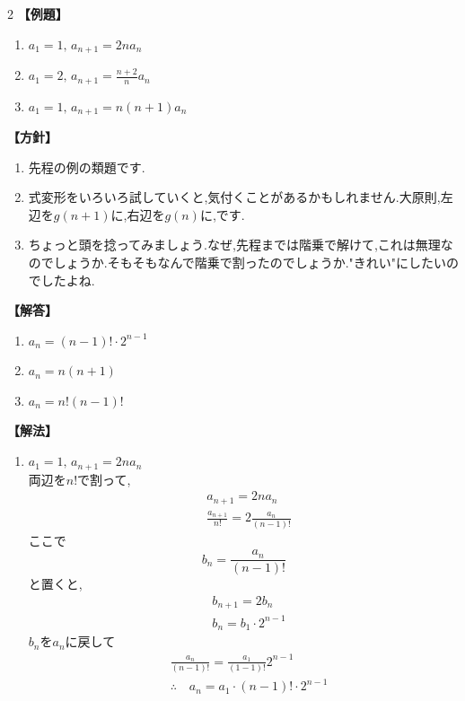 \documentclass[dvipdfmx,a4paper,11pt,fleqn,openany]{jsbook}
\begin{document}
\begin{multicols*}{2}
      \noindent \textbf{【例題】}
      \begin{enumerate}[label=(\arabic*),parsep=3pt]
        \item $\displaystyle a_1=1,\, a_{n+1}=2na_n$
        \item $\displaystyle a_1=2,\, a_{n+1}=\frac{n+2}{n}a_n$
        \item $\displaystyle a_1=1,\, a_{n+1}=n(n+1)a_n$
      \end{enumerate}

      \noindent\textbf{【方針】}
      \begin{enumerate}[label=(\arabic*),parsep=3pt]
        \item 先程の例の類題です.
        \item 式変形をいろいろ試していくと,気付くことがあるかもしれません.大原則,左辺を$g(n+1)$に,右辺を$g(n)$に,です.
        \item ちょっと頭を捻ってみましょう.なぜ,先程までは階乗で解けて,これは無理なのでしょうか.そもそもなんで階乗で割ったのでしょうか."きれい"にしたいのでしたよね.
      \end{enumerate}

      \noindent\textbf{【解答】}
      \begin{enumerate}[label=(\arabic*),parsep=3pt]
        \item $\displaystyle a_n=(n-1)!\cdot 2^{n-1}$
        \item $\displaystyle a_n=n(n+1)$
        \item $\displaystyle a_n=n!(n-1)!$
      \end{enumerate}

      \noindent\textbf{【解法】}
      \begin{enumerate}[label=(\arabic*),parsep=3pt]
        \item $\displaystyle a_1=1,\, a_{n+1}=2na_n$\\
              両辺を$n!$で割って,
              \begin{align*}
                &a_{n+1}=2na_n\\
                &\frac{a_{n+1}}{n!}=2\frac{a_n}{(n-1)!}
              \end{align*}
              ここで
              \[
                b_n=\frac{a_n}{(n-1)!}
              \]
              と置くと,
              \begin{align*} 
                &b_{n+1}=2b_n\\
                &b_n=b_1\cdot 2^{n-1}
              \end{align*}
              $b_n$を$a_n$に戻して
              \begin{align*} 
                &\frac{a_n}{(n-1)!}=\frac{a_1}{(1-1)!}2^{n-1}\\
                &\therefore \quad a_n=a_1 \cdot (n-1)! \cdot 2^{n-1}
              \end{align*}
              

\end{enumerate}
\end{multicols*}
\end{document}
